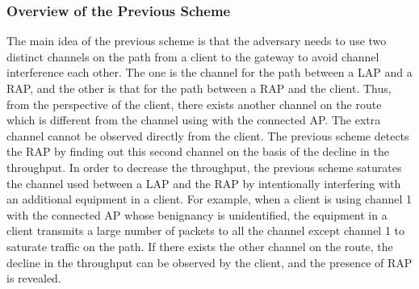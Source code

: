 \documentclass[conference]{IEEEtran}
\begin{document}
\subsubsection{Overview of the Previous Scheme}
The main idea of the previous scheme \cite{previous} is that the adversary needs to use two distinct channels on the path from a client to the gateway to avoid channel interference each other.
The one is the channel for the path between a LAP and a RAP, and the other is that for the path between a RAP and the client.
Thus, from the perspective of the client, there exists another channel on the route which is different from the channel using with the connected AP.
The extra channel cannot be observed directly from the client.
The previous scheme detects the RAP by finding out this second channel on the basis of the decline in the throughput.
In order to decrease the throughput, the previous scheme saturates the channel used between a LAP and the RAP by intentionally interfering with an additional equipment in a client.
For example, when a client is using channel 1 with the connected AP whose benignancy is unidentified, the equipment in a client transmits a large number of packets to all the channel except channel 1 to saturate traffic on the path.
If there exists the other channel on the route, the decline in the throughput can be observed by the client, and the presence of RAP is revealed.
\end{document}
